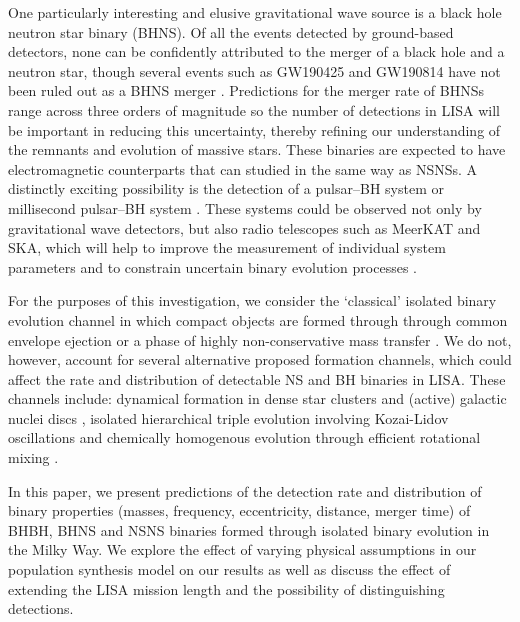 One particularly interesting and elusive gravitational wave source is a black hole neutron star binary (BHNS). Of all the events detected by ground-based detectors, none can be confidently attributed to the merger of a black hole and a neutron star, though several events such as GW190425 and GW190814 have not been ruled out as a BHNS merger \citep{Abbott+2020_GW190425,Abbott+2020_GW190814}. Predictions for the merger rate of BHNSs range across three orders of magnitude \citep[e.g.][]{Abadie+2010, Broekgaarden+2021} so the number of detections in LISA will be important in reducing this uncertainty, thereby refining our understanding of the remnants and evolution of massive stars. These binaries are expected to have electromagnetic counterparts that can studied in the same way as NSNSs. A distinctly exciting possibility is the detection of a pulsar--BH system or millisecond pulsar--BH system \citep{Narayan+1991}. These systems could be observed not only by gravitational wave detectors, but also radio telescopes such as MeerKAT and SKA, which will help to improve the measurement of individual system parameters and to constrain uncertain binary evolution processes \citep[e.g.][]{Pfahl+2005,Chattopadhyay+2020}.

For the purposes of this investigation, we consider the `classical' isolated binary evolution channel \citep[e.g.][]{Tutukov+1973,Tutukov+1993,Smarr+1976,Srinivasan+1989,Kalogera+2007,Belczynski+2016} in which compact objects are formed through through common envelope ejection or a phase of highly non-conservative mass transfer \citep{Heuvel+2011, vandenHeuvel+2017}. We do not, however, account for several alternative proposed formation channels, which could affect the rate and distribution of detectable NS and BH binaries in LISA. These channels include: dynamical formation in dense star clusters \citep[e.g.][]{Sigurdsson+1993,PortegiesZwart+2000,Miller+2009,Rodriguez+2015} and (active) galactic nuclei discs \citep[e.g.][]{Morris+1993, Antonini+2016, McKernan+2020}, isolated hierarchical triple evolution involving Kozai-Lidov oscillations \citep[e.g.][]{Stephan+2016, Silsbee+2017,Antonini+2017, Toonen+2020} and chemically homogenous evolution through efficient rotational mixing \citep[e.g.][]{deMink+2009, deMink+2016,Marchant+2016,duBuisson+2020}.

In this paper, we present predictions of the detection rate and distribution of binary properties (masses, frequency, eccentricity, distance, merger time) of BHBH, BHNS and NSNS binaries formed through isolated binary evolution in the Milky Way. We explore the effect of varying physical assumptions in our population synthesis model on our results as well as discuss the effect of extending the LISA mission length and the possibility of distinguishing detections.

